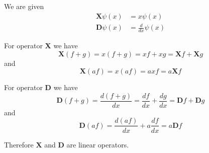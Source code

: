 


\bigskip
We are given
\begin{align*}
\mathbf X\psi(x)&=x\psi(x)\tag{8.5}
\\[1ex]
\mathbf D\psi(x)&=\frac{d}{dx}\psi(x)\tag{8.6}
\end{align*}

For operator $\mathbf X$ we have
\begin{equation*}
\mathbf X(f+g)=x(f+g)=xf+xg=\mathbf Xf+\mathbf Xg
\end{equation*}
and
\begin{equation*}
\mathbf X(af)=x(af)=axf=a\mathbf Xf
\end{equation*}

For operator $\mathbf D$ we have
\begin{equation*}
\mathbf D(f+g)=\frac{d(f+g)}{dx}=\frac{df}{dx}+\frac{dg}{dx}=\mathbf Df+\mathbf Dg
\end{equation*}
and
\begin{equation*}
\mathbf D(af)=\frac{d(af)}{dx}+a\frac{df}{dx}=a\mathbf Df
\end{equation*}

Therefore $\mathbf X$ and $\mathbf D$ are linear operators.


